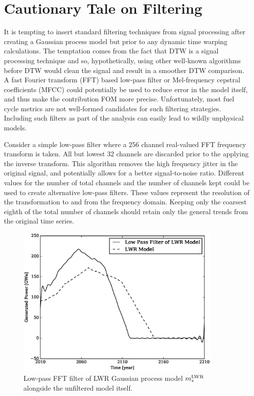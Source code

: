 \clearpage
\section{Cautionary Tale on Filtering}
\label{filtering}

It is tempting to insert standard filtering techniques from signal processing 
after creating a Gaussian process model but prior to any dynamic time warping 
calculations. The temptation comes from the fact that DTW is a signal 
processing technique and so, hypothetically, using other well-known algorithms
before DTW would clean the signal and result in a smoother DTW comparison.
A fast Fourier transform (FFT) based low-pass filter 
\cite{merletti1999standards,moreland2003fft} or 
Mel-frequency cepstral coefficients (MFCC) \cite{muda2010voice,imai1983cepstral} 
could potentially be used to reduce error in the model itself, 
and thus make the contribution FOM more precise. Unfortunately, most 
fuel cycle metrics are not well-formed candidates for such filtering strategies.
Including such filters as part of the analysis can easily lead to wildly unphysical
models.

Consider a simple low-pass filter where a 256 channel real-valued FFT frequency 
transform is taken.  All but lowest 32 channels are discarded prior to the applying 
the inverse transform. This algorithm removes the
high frequency jitter in the original signal, and 
potentially allows for a better signal-to-noise ratio. Different values
for the number of total channels and the number of channels kept could be 
used to create alternative low-pass filters. These values represent the 
resolution of the transformation to and from the frequency domain. Keeping
only the coarsest eighth of the total number of channels should retain only
the general trends from the original time series.

\begin{figure}[htb]
\centering
\includegraphics[width=0.9\textwidth]{fft-lwr-model.eps}
\caption{Low-pass FFT filter of LWR Gaussian process model $m_*^{\mathrm{LWR}}$ alongside
the unfiltered model itself.}
\label{fft-lwr-model}
\end{figure}

